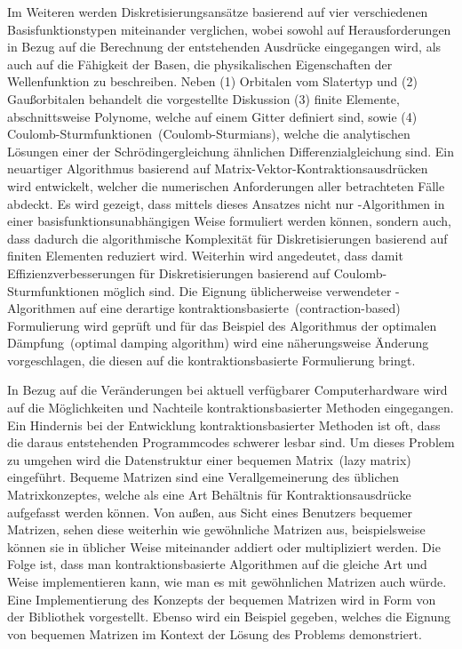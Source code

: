 Im Weiteren werden Diskretisierungsansätze basierend auf vier verschiedenen
Basisfunktionstypen miteinander verglichen,
wobei sowohl auf Herausforderungen in Bezug auf die Berechnung
der entstehenden Ausdrücke
eingegangen wird,
als auch auf die Fähigkeit der Basen,
die physikalischen Eigenschaften der Wellenfunktion zu beschreiben.
Neben (1) Orbitalen vom Slatertyp und (2) Gaußorbitalen
behandelt die vorgestellte Diskussion
(3) finite Elemente,
abschnittsweise Polynome, welche auf einem Gitter definiert sind,
sowie (4) Coulomb-Sturmfunktionen~(Coulomb-Sturmians),
welche die analytischen Lösungen einer der Schrödingergleichung
ähnlichen Differenzialgleichung sind.
Ein neuartiger Algorithmus basierend auf Matrix-Vektor-Kontraktionsausdrücken
wird entwickelt,
welcher die numerischen Anforderungen aller betrachteten Fälle abdeckt.
Es wird gezeigt, dass mittels dieses Ansatzes
nicht nur \SCF-Algorithmen in einer basisfunktionsunabhängigen Weise
formuliert werden können, sondern auch,
dass dadurch die algorithmische Komplexität
für Diskretisierungen basierend auf finiten Elementen reduziert wird.
Weiterhin wird angedeutet,
dass damit Effizienzverbesserungen
für Diskretisierungen basierend auf Coulomb-Sturmfunktionen
möglich sind.
Die Eignung üblicherweise verwendeter \SCF-Algorithmen
auf eine derartige kontraktionsbasierte~(contraction-based)
Formulierung wird geprüft
und für das Beispiel des Algorithmus der optimalen Dämpfung~(optimal damping algorithm)
wird eine näherungsweise Änderung vorgeschlagen,
die diesen auf die kontraktionsbasierte Formulierung bringt.

In Bezug auf die Veränderungen bei aktuell verfügbarer Computerhardware
wird auf die Möglichkeiten und Nachteile
kontraktionsbasierter Methoden eingegangen.
Ein Hindernis bei der Entwicklung kontraktionsbasierter Methoden
ist oft, dass die daraus entstehenden Programmcodes
schwerer lesbar sind.
Um dieses Problem zu umgehen wird die Datenstruktur
einer bequemen Matrix~(lazy matrix) eingeführt.
Bequeme Matrizen sind eine Verallgemeinerung des üblichen Matrixkonzeptes,
welche als eine Art Behältnis für Kontraktionsausdrücke aufgefasst
werden können.
Von außen, aus Sicht eines Benutzers bequemer Matrizen,
sehen diese weiterhin wie gewöhnliche Matrizen aus,
beispielsweise können sie in üblicher Weise
miteinander addiert oder multipliziert werden.
Die Folge ist,
dass man kontraktionsbasierte Algorithmen auf die gleiche Art und Weise
implementieren kann,
wie man es mit gewöhnlichen Matrizen auch würde.
Eine Implementierung des Konzepts der bequemen Matrizen
wird in Form von der Bibliothek \lazyten vorgestellt.
Ebenso wird ein Beispiel gegeben,
welches die Eignung von bequemen Matrizen im Kontext der
Lösung des \HF Problems demonstriert.

